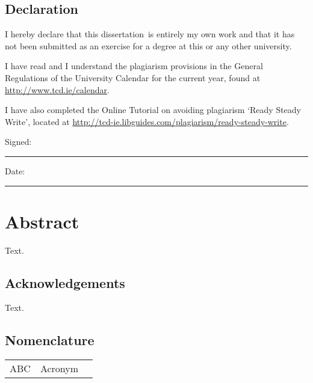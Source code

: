 \documentclass[a4paper,oneside,12pt]{book}
\title{\thesistitle}
\author{\authorname}
\newcommand{\typeofthesis}{dissertation}
\begin{document}

\section*{\Huge{Declaration}}
\vspace{1cm}
I hereby declare that this \typeofthesis\ is entirely my own work and that it has not been submitted as an exercise for a degree at this or any other university.

\vspace{1cm}
I have read and I understand the plagiarism provisions in the General Regulations of the University Calendar for the current year, found at \url{http://www.tcd.ie/calendar}.
\vspace{1cm}

I have also completed the Online Tutorial on avoiding plagiarism `Ready Steady Write', located at \url{http://tcd-ie.libguides.com/plagiarism/ready-steady-write}.
\vspace{3cm}

Signed:~\rule{5cm}{0.3pt}\hfill Date:~\rule{5cm}{0.3pt}

\chapter*{Abstract}

Text.

\newpage
\onehalfspacing\raggedright

\section*{\Huge{Acknowledgements}}

Text.

\tableofcontents
\listoffigures
\listoftables
\lstlistoflistings
\newpage

\section*{\Huge{Nomenclature}}
\begin{tabular}{lp{9cm}l}
ABC&Acronym\\
\end{tabular}
\vspace{2cm}

\mainmatter








\appendix
\renewcommand{\thechapter}{A\arabic{chapter}}

\end{document}
